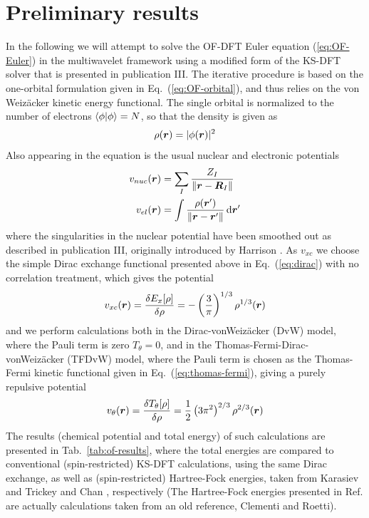 \section{Preliminary results}
In the following we will attempt to solve the OF-DFT Euler equation (\ref{eq:OF-Euler}) in the multiwavelet 
framework using a modified form of the KS-DFT solver that is presented in publication III. The iterative
procedure is based on the one-orbital formulation given in Eq.~(\ref{eq:OF-orbital}), and thus relies on the
von Weiz\"{a}cker kinetic energy functional. The single orbital is normalized to the number of electrons 
$\langle\phi|\phi\rangle = N$, so that the density is given as
\begin{equation}
    \rho(\boldsymbol r) = |\phi(\boldsymbol r)|^2
\end{equation}
Also appearing in the equation is the usual nuclear and electronic potentials
\begin{align}
    v_{nuc}(\boldsymbol r) &= \sum_{I} \frac{Z_I}{\|\boldsymbol r-\boldsymbol R_I\|} \\
    v_{el}(\boldsymbol r) &= \int \frac{\rho(\boldsymbol r')}{\|\boldsymbol r-\boldsymbol r'\|} \,\mathrm{d}\boldsymbol r'
\end{align}
where the singularities in the nuclear potential have been smoothed out as described in publication III, 
originally introduced by Harrison \etal\cite{Harrison_basic:2004}. As $v_{xc}$ we choose the simple Dirac exchange
functional presented above in Eq.~(\ref{eq:dirac}) with no correlation treatment, which gives the potential
\begin{equation}
    v_{xc}(\boldsymbol r) = \frac{\delta E_x[\rho]}{\delta \rho} = -\left(\frac{3}{\pi}\right)^{1/3} \rho^{1/3}(\boldsymbol r)
\end{equation}
and we perform calculations both in the Dirac-vonWeiz\"{a}cker (DvW) model, where the Pauli term is zero 
$T_\theta = 0$, and in the Thomas-Fermi-Dirac-vonWeiz\"{a}cker (TFDvW) model, where the Pauli term is chosen as
the Thomas-Fermi kinetic functional given in Eq.~(\ref{eq:thomas-fermi}), giving a purely repulsive potential
\begin{equation}
    v_\theta(\boldsymbol r) = \frac{\delta T_\theta[\rho]}{\delta\rho} = \frac{1}{2}\left(3\pi^2\right)^{2/3} \rho^{2/3}(\boldsymbol r)
\end{equation}
The results (chemical potential and total energy) of such calculations are presented in Tab.~\ref{tab:of-results}, where
the total energies are compared to conventional (spin-restricted) KS-DFT calculations, using the same Dirac exchange,
as well as (spin-restricted) Hartree-Fock energies, taken from Karasiev and Trickey\cite{Karasiev:2012} and Chan 
\etal\cite{Chan:2000}, respectively (The Hartree-Fock energies presented in Ref.\cite{Chan:2000} are actually calculations 
taken from an old reference, Clementi and Roetti\cite{Clementi:1974}).

